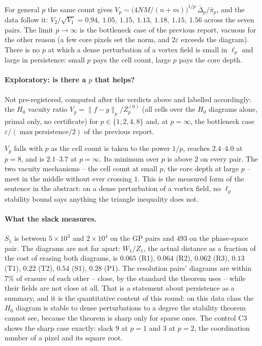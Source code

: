 \documentclass[11pt,a4paper]{article}
\begin{document}
For general $p$ the same count gives $V_p\sim\big(4NM/(n+m)\big)^{1/p}\,\bar\Delta_p/\bar\pi_p$,
and the data follow it: $V_2/\sqrt{V_1}=0.94,\ 1.05,\ 1.15,\ 1.13,\ 1.18,\ 1.15,\ 1.56$ across the
seven pairs. The limit $p\to\infty$ is the bottleneck case of the previous report, vacuous for the
other reason (a few core pixels set the norm, and $2\varepsilon$ exceeds the diagram). There is no
$p$ at which a dense perturbation of a vortex field is small in $\ell_p$ and large in persistence:
small $p$ pays the cell count, large $p$ pays the core depth.

\paragraph{Exploratory: is there a $p$ that helps?} Not pre-registered, computed after the verdicts
above and labelled accordingly: the $H_0$ vacuity ratio $V_p=\|f-g\|_p/Z^{(0)}_p$ (all cells over the
$H_0$ diagrams alone, primal only, no certificate) for $p\in\{1,2,4,8\}$ and, at $p=\infty$, the
bottleneck case $\varepsilon/(\max\text{persistence}/2)$ of the previous report.

\begin{center}\small

\end{center}

$V_p$ falls with $p$ as the cell count is taken to the power $1/p$, reaches $2.4$--$4.0$ at $p=8$,
and is $2.1$--$3.7$ at $p=\infty$. Its minimum over $p$ is above $2$ on every pair. The two vacuity
mechanisms -- the cell count at small $p$, the core depth at large $p$ -- meet in the middle without
ever crossing $1$. This is the measured form of the sentence in the abstract: on a dense perturbation
of a vortex field, no $\ell_p$ stability bound says anything the triangle inequality does not.

\paragraph{What the slack measures.} $S_1$ is between $5\times10^3$ and $2\times10^4$ on the GP
pairs and $493$ on the phase-space pair. The diagrams are not far apart: $W_1/Z_1$, the actual
distance as a fraction of the cost of erasing both diagrams, is $0.065$ (R1), $0.064$ (R2), $0.062$
(R3), $0.13$ (T1), $0.22$ (T2), $0.54$ (S1), $0.28$ (P1). The resolution pairs' diagrams are within
$7\%$ of erasure of each other -- close, by the standard the theorem uses -- while their fields are
not close at all. That is a statement about persistence as a summary, and it is the quantitative
content of this round: on this data class the $H_0$ diagram is stable to dense perturbations to a
degree the stability theorem cannot see, because the theorem is sharp only for sparse ones. The
control C3 shows the sharp case exactly: slack $9$ at $p=1$ and $3$ at $p=2$, the coordination number
of a pixel and its square root.
\end{document}
